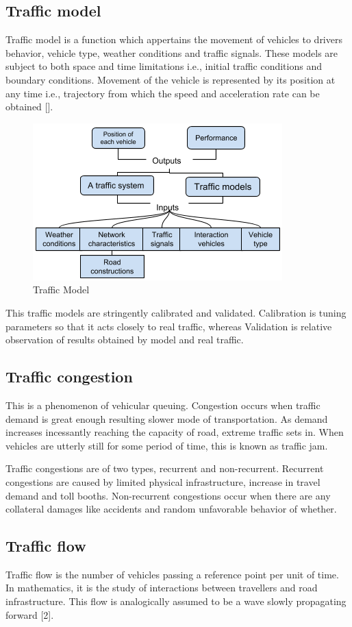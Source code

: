 \documentclass[12pt,a4paper]{report}
\begin{document}
	\subsection*{Traffic model}
	Traffic model is a function which appertains the movement of vehicles to drivers behavior, vehicle type, weather conditions and traffic signals. These models are subject to both space and time limitations i.e., initial traffic conditions and boundary conditions. Movement of the vehicle is represented by its position at any time i.e., trajectory from which the speed and acceleration rate can be obtained [].
	\begin{figure}[hbtp]
		\centering
		\includegraphics[scale=1]{some.png}
		\caption{Traffic Model}
	\end{figure}
	This traffic models are stringently calibrated and validated. Calibration is tuning parameters so that it acts closely to real traffic, whereas Validation is relative observation of results obtained by model and real traffic.
	\subsection*{Traffic congestion}
	This is a phenomenon of vehicular queuing. Congestion occurs when traffic demand is great enough resulting slower mode of transportation. As demand increases incessantly reaching the capacity of road, extreme traffic sets in. When vehicles are utterly still for some period of time, this is known as traffic jam.
	\par Traffic congestions are of two types, recurrent and non-recurrent. Recurrent congestions are caused by limited physical infrastructure, increase in travel demand and toll booths. Non-recurrent congestions occur when there are any collateral damages like accidents and random unfavorable behavior of whether.
	\subsection*{Traffic flow}
	Traffic flow is the number of vehicles passing a reference point per unit of time. In mathematics, it is the study of interactions between travellers and road infrastructure. This flow is analogically assumed to be a wave slowly propagating forward [2].
	
\end{document}
